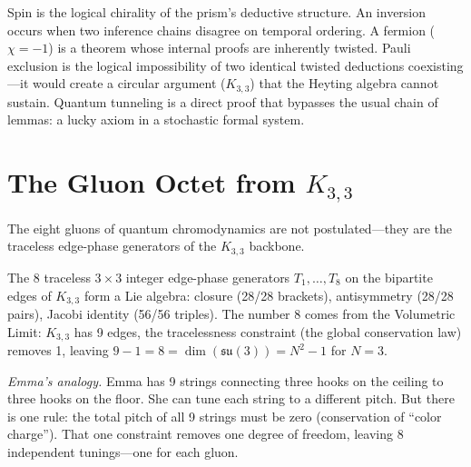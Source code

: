 \documentclass[11pt, a4paper, openany]{book}
\newcounter{thm}[chapter]
\begin{document}
\begin{logicalreading}
Spin is the logical chirality of the prism's deductive structure. An inversion occurs when two inference chains disagree on temporal ordering. A fermion ($\chi = -1$) is a theorem whose internal proofs are inherently twisted. Pauli exclusion is the logical impossibility of two identical twisted deductions coexisting---it would create a circular argument ($K_{3,3}$) that the Heyting algebra cannot sustain. Quantum tunneling is a direct proof that bypasses the usual chain of lemmas: a lucky axiom in a stochastic formal system.
\end{logicalreading}

\section{The Gluon Octet from $K_{3,3}$}\label{sec:gluon-octet}

The eight gluons of quantum chromodynamics are not postulated---they are
the traceless edge-phase generators of the $K_{3,3}$ backbone.

\begin{theorem}\label{thm:gluon-octet}
The 8 traceless $3 \times 3$ integer edge-phase generators
$T_1, \ldots, T_8$ on the bipartite edges of $K_{3,3}$ form a Lie
algebra: closure (28/28 brackets), antisymmetry (28/28 pairs),
Jacobi identity (56/56 triples). The number 8 comes from the Volumetric
Limit: $K_{3,3}$ has 9 edges, the tracelessness constraint (the global
conservation law) removes 1, leaving
$9 - 1 = 8 = \dim(\mathfrak{su}(3)) = N^2 - 1$ for $N = 3$.
\end{theorem}

\smallskip\noindent
\textit{Emma's analogy.}
Emma has 9 strings connecting three hooks on the ceiling to three hooks
on the floor. She can tune each string to a different pitch. But there
is one rule: the total pitch of all 9 strings must be zero (conservation
of ``color charge''). That one constraint removes one degree of freedom,
leaving 8 independent tunings---one for each gluon.
\smallskip
\end{document}
